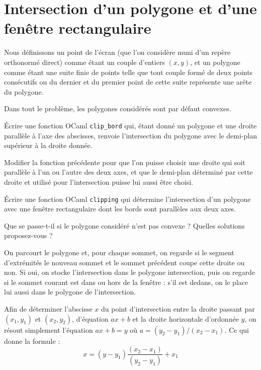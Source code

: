 \renewcommand{\SourceFile}{6-geometrie-et-images/src/6-5.ml}

\section[Intersection d'un polygone et d'une fenêtre rectangulaire]{Intersection d'un polygone et d'une\\ fenêtre rectangulaire}

Nous définissons un point de l'écran (que l'on considère muni d'un repère orthonormé direct) comme étant un couple d'entiers $(x,y)$, et un polygone comme étant une suite finie de points telle que tout couple formé de deux points consécutifs ou du dernier et du premier point de cette suite représente une arête du polygone.
\medskip

Dans tout le problème, les polygones considérés sont par défaut convexes.

\Q
Écrire une fonction OCaml \texttt{clip\_bord} qui, étant donné un polygone et une droite parallèle à l'axe des abscisses, renvoie l'intersection du polygone avec le demi-plan supérieur à la droite donnée.

\Q
Modifier la fonction précédente pour que l'on puisse choisir une droite qui soit parallèle à l'un ou l'autre des deux axes, et que le demi-plan déterminé par cette droite et utilisé pour l'intersection puisse lui aussi être choisi.

\Q
Écrire une fonction OCaml \texttt{clipping} qui détermine l'intersection d'un polygone avec une fenêtre rectangulaire dont les bords sont parallèles aux deux axes.

\Q
Que se passe-t-il si le polygone considéré n'est pas convexe ? Quelles solutions proposez-vous ?

\Corrige

\Q
On parcourt le polygone et, pour chaque sommet, on regarde si le segment d'extrémités le nouveau sommet et le sommet précédent coupe cette droite ou non. Si oui, on stocke l'intersection dans le polygone intersection, puis on regarde si le sommet courant est dans ou hors de la fenêtre : s'il est dedans, on le place lui aussi dans le polygone de l'intersection.
\medskip

Afin de déterminer l'abscisse $x$ du point d'intersection entre la droite passant par $(x_1,y_1)$ et $(x_2,y_2)$, d'équation $ax+b$ et la droite horizontale d'ordonnée $y$, on résout simplement l'équation $ax+b=y$ où $a=(y_2-y_1)/(x_2-x_1)$. Ce qui donne la formule :
\[
    x = (y-y_1)\frac{(x_2-x_1)}{(y_2-y_1)} + x_1
\]

